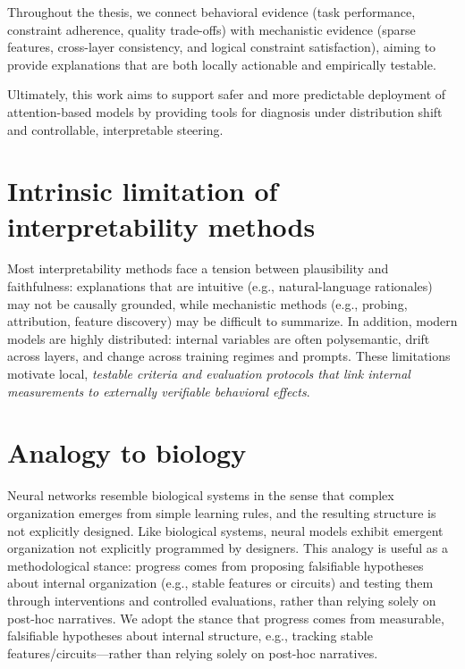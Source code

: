 \documentclass[../infufrgs/ppgc-tese.tex]{subfiles}
\begin{document}
Throughout the thesis, we connect behavioral evidence (task performance, constraint adherence, quality trade-offs) with mechanistic evidence (sparse features, cross-layer consistency, and logical constraint satisfaction), aiming to provide explanations that are both locally actionable and empirically testable.

Ultimately, this work aims to support safer and more predictable deployment of attention-based models by providing tools for diagnosis under distribution shift and controllable, interpretable steering.



\section{Intrinsic limitation of interpretability methods}
Most interpretability methods face a tension between plausibility and faithfulness: explanations that are intuitive (e.g., natural-language rationales) may not be causally grounded, while mechanistic methods  (e.g., probing, attribution, feature discovery) may be difficult to summarize.
In addition, modern models are highly distributed: internal variables are often polysemantic, drift across layers, and change across training regimes and prompts. 
These limitations motivate local, \emph{testable criteria and evaluation protocols that link internal measurements to externally verifiable behavioral effects}.

\section{Analogy to biology}
Neural networks resemble biological systems in the sense that complex organization emerges from simple learning rules, and the resulting structure is not explicitly designed.
Like biological systems, neural models exhibit emergent organization not explicitly programmed by designers. 
This analogy is useful as a methodological stance: progress comes from proposing falsifiable hypotheses about internal organization (e.g., stable features or circuits) and testing them through interventions and controlled evaluations, rather than relying solely on post-hoc narratives.
We adopt the stance that progress comes from measurable, falsifiable hypotheses about internal structure, e.g., tracking stable features/circuits—rather than relying solely on post-hoc narratives.
\end{document}
